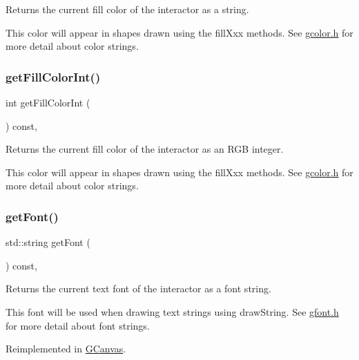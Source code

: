 Returns the current fill color of the interactor as a string. 

This color will appear in shapes drawn using the fill\+Xxx methods. See \mbox{\hyperlink{gcolor_8h_source}{gcolor.\+h}} for more detail about color strings. \mbox{\label{classGDrawingSurface_a88f4508d9271c4b5f5b5d6b780f223d0}} 
\subsubsection{\texorpdfstring{get\+Fill\+Color\+Int()}{getFillColorInt()}}
{\footnotesize\ttfamily int get\+Fill\+Color\+Int (\begin{DoxyParamCaption}{ }\end{DoxyParamCaption}) const\hspace{0.3cm}{\ttfamily [virtual]}, {\ttfamily [inherited]}}



Returns the current fill color of the interactor as an R\+GB integer. 

This color will appear in shapes drawn using the fill\+Xxx methods. See \mbox{\hyperlink{gcolor_8h_source}{gcolor.\+h}} for more detail about color strings. \mbox{\label{classGDrawingSurface_a894a5502900794eeb27d084c21f1d77d}} 
\subsubsection{\texorpdfstring{get\+Font()}{getFont()}}
{\footnotesize\ttfamily std\+::string get\+Font (\begin{DoxyParamCaption}{ }\end{DoxyParamCaption}) const\hspace{0.3cm}{\ttfamily [virtual]}, {\ttfamily [inherited]}}



Returns the current text font of the interactor as a font string. 

This font will be used when drawing text strings using draw\+String. See \mbox{\hyperlink{gfont_8h_source}{gfont.\+h}} for more detail about font strings. 

Reimplemented in \mbox{\hyperlink{classGCanvas_aa0829769ac6325b5c58d27c8e363cb78}{G\+Canvas}}.

